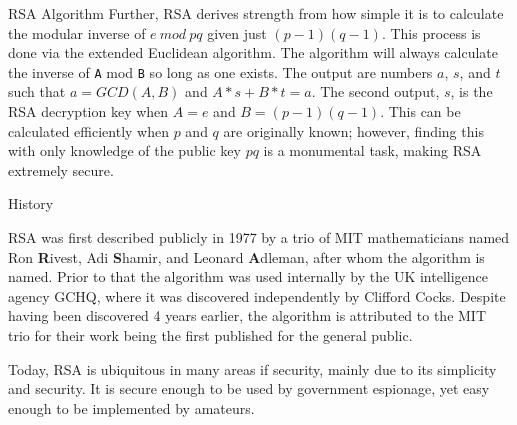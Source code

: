 \documentclass[landscape,fontscale=.4,paperwidth=48in,paperheight=36in]{baposter} %
\begin{document}
\begin{poster}
\begin{posterbox}[name=rsa,column=13,row=0,span=17]{RSA Algorithm}
Further, RSA derives strength from how simple it is to calculate the modular inverse of $e\ mod\ pq$ given just $(p-1)(q-1)$. This process is done via the extended Euclidean algorithm. The algorithm will always calculate the inverse of \verb|A| mod \verb|B| so long as one exists. The output are numbers $a$, $s$, and $t$ such that $a = GCD(A,B)$ and $A*s + B*t = a$. The second output, $s$, is the RSA decryption key when $A=e$ and ${B=(p-1)(q-1)}$. This can be calculated efficiently when $p$ and $q$ are originally known; however, finding this with only knowledge of the public key $pq$ is a monumental task, making RSA extremely secure.  
\end{posterbox}



\begin{posterbox}[name=history, column=13, below=rsa,span=17]{History}
\begin{multicols}{2}
RSA was first described publicly in 1977 by a trio of MIT mathematicians named Ron \textbf{R}ivest, Adi \textbf{S}hamir, and Leonard \textbf{A}dleman, after whom the algorithm is named. Prior to that the algorithm was used internally by the UK intelligence agency GCHQ, where it was discovered independently by Clifford Cocks. Despite having been discovered 4 years earlier, the algorithm is attributed to the MIT trio for their work being the first published for the general public.

Today, RSA is ubiquitous in many areas if security, mainly due to its simplicity and security. It is secure enough to be used by government espionage, yet easy enough to be implemented by amateurs. 


\end{multicols}
\end{posterbox}
\end{poster}
\end{document}
